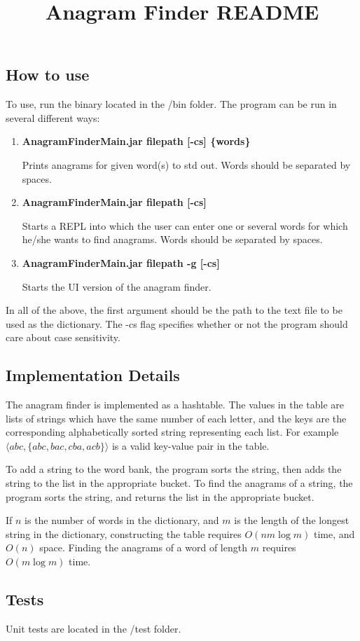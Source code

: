 \documentclass[12pt,letterpaper]{article}
\begin{document}
\title{\vspace{-2cm}Anagram Finder README\vspace{-1cm}}
\date{}
\maketitle
\subsection*{How to use}
To use, run the binary located in the /bin folder. The program can be run in several different ways:
\begin{enumerate}
\item {\bf AnagramFinderMain.jar filepath [-cs] \{words\}}

Prints anagrams for given word(s) to std out. Words should be separated by spaces.

\item {\bf AnagramFinderMain.jar filepath [-cs]}

Starts a REPL into which the user can enter one or several words for which he/she wants to find anagrams. Words should be separated by spaces.

\item {\bf AnagramFinderMain.jar filepath -g [-cs]}

Starts the UI version of the anagram finder.
\end{enumerate}

In all of the above, the first argument should be the path to the text file to be used as the dictionary. The -cs flag specifies whether or not the program should care about case sensitivity.
\subsection*{Implementation Details}
The anagram finder is implemented as a hashtable. The values in the table are lists of strings which have the same number of each letter, and the keys are the corresponding alphabetically sorted string representing each list. For example $\langle abc, \{abc, bac, cba, acb\} \rangle$ is a valid key-value pair in the table.

To add a string to the word bank, the program sorts the string, then adds the string to the list in the appropriate bucket. To find the anagrams of a string, the program sorts the string, and returns the list in the appropriate bucket.

If $n$ is the number of words in the dictionary, and $m$ is the length of the longest string in the dictionary, constructing the table requires $O(nm \log m)$ time, and $O(n)$ space. Finding the anagrams of a word of length $m$ requires $O(m \log m)$ time.

\subsection*{Tests}
Unit tests are located in the /test folder.
\end{document}
